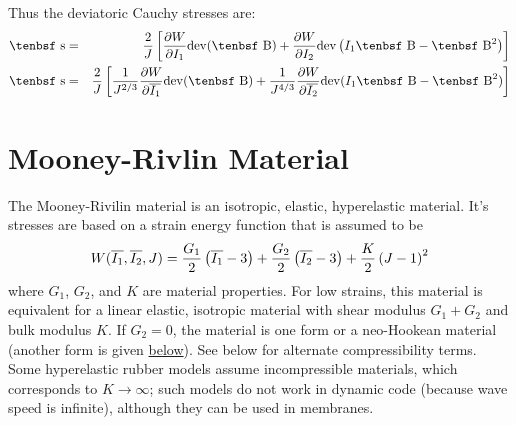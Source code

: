 \documentclass[11pt]{book}
\def\B{\hbox{\tenbsf B}}
\def\dev{\hbox{\tenbsf s}}
\begin{document}
Thus the deviatoric Cauchy stresses are:
\begin{eqnarray}
   \dev & = &  {2\over J}\left[ {\partial W\over \partial I_1}{\rm dev}(\B)
                                             + {\partial W\over \partial I_2}{\rm dev}\left(I_1\B- \B^2\right)
                                            \right]      \\
   \dev & = &  {2\over J}\left[ {1\over J^{2/3}}{\partial W\over \partial \overline{I_1}}{\rm dev}(\B)
                                        + {1\over J^{4/3}}{\partial W\over \partial \overline{I_2}}{\rm dev}( I_1 \B- \B^2)
                                           \right]
\end{eqnarray}


\section{Mooney-Rivlin Material\label{MRM}}

The Mooney-Rivilin material is an isotropic, elastic, hyperelastic material. It's stresses are based on a strain energy function that is assumed to be
\begin{equation}
W(\overline{I_1},\overline{I_2},J)= {G_1\over2}\left(\overline{I_1}-3\right) + {G_2\over2}\left(\overline{I_2}-3\right) + {K\over2}\left(J-1\right)^2
\end{equation}
where $G_1$, $G_2$, and $K$ are material properties.
For low strains, this material is equivalent for a linear elastic, isotropic material with shear modulus $G_1+G_2$ and bulk modulus $K$. If $G_2=0$, the material is one form or a neo-Hookean material (another form is given \hyperref[NHM]{below}). See below for alternate compressibility terms. Some hyperelastic rubber models assume incompressible materials, which corresponds to $K\to\infty$; such models do not work in dynamic code (because wave speed is infinite), although they can be used in membranes.
\end{document}
